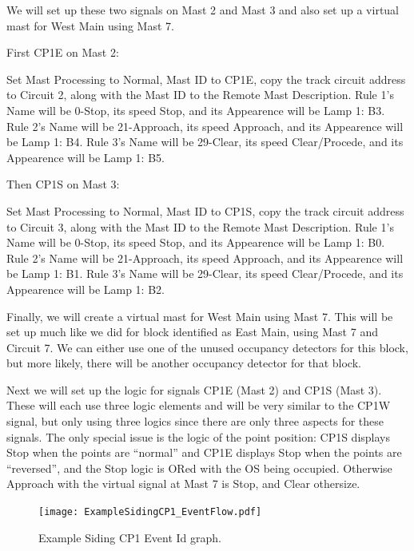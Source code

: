 We will set up these two signals on Mast 2 and Mast 3 and also set up a 
virtual mast for West Main using Mast 7.

First CP1E on Mast 2:

Set Mast Processing to Normal, Mast ID to CP1E, copy the track circuit address 
to Circuit 2, along with the Mast ID to the Remote Mast Description. Rule 1's
Name will be 0-Stop, its speed Stop, and its Appearence will be Lamp 1: B3.
Rule 2's Name will be 21-Approach, its speed Approach, and its Appearence will 
be Lamp 1: B4. Rule 3's Name will be 29-Clear, its speed Clear/Procede, and 
its Appearence will be Lamp 1: B5.

Then CP1S on Mast 3:

Set Mast Processing to Normal, Mast ID to CP1S, copy the track circuit address 
to Circuit 3, along with the Mast ID to the Remote Mast Description. Rule 1's
Name will be 0-Stop, its speed Stop, and its Appearence will be Lamp 1: B0.
Rule 2's Name will be 21-Approach, its speed Approach, and its Appearence will 
be Lamp 1: B1. Rule 3's Name will be 29-Clear, its speed Clear/Procede, and 
its Appearence will be Lamp 1: B2.

Finally, we will create a virtual mast for West Main using Mast 7.  This will 
be set up much like we did for block identified as East Main, using Mast 7 and 
Circuit 7.  We can either use one of the unused occupancy detectors for this 
block, but more likely, there will be another occupancy detector for that 
block.

Next we will set up the logic for signals CP1E (Mast 2) and CP1S (Mast 3).  
These will each use three logic elements and will be very similar to the CP1W 
signal, but only using three logics since there are only three aspects for 
these signals.  The only special issue is the logic of the point position: 
CP1S displays Stop when the points are ``normal'' and CP1E displays Stop when 
the points are ``reversed'', and the Stop logic is ORed with the OS being 
occupied. Otherwise Approach with the virtual signal at Mast 7 is Stop, and 
Clear othersize.

\begin{figure}[hbpt]\begin{centering}%
\texttt{[image: ExampleSidingCP1\_EventFlow.pdf]}
\caption{Example Siding CP1  Event Id graph.}
\label{fig:ExampleSidingCP1EventFlow}
\end{centering}\end{figure}



\clearpage
